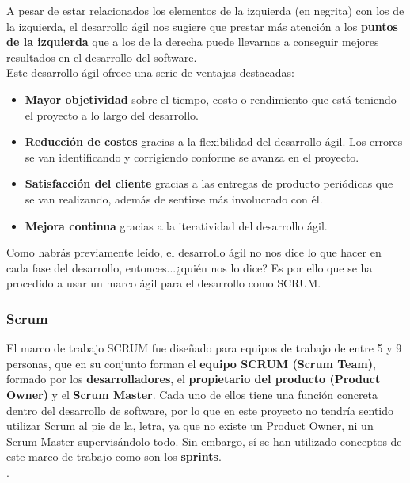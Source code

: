 A pesar de estar relacionados los elementos de la izquierda (en negrita) con los de la
izquierda, el desarrollo ágil nos sugiere que prestar más atención a los \textbf{puntos
de la izquierda} que a los de la derecha puede llevarnos a conseguir mejores resultados
en el desarrollo del software.\\

Este desarrollo ágil ofrece una serie de ventajas \cite{advantages-agile-methodology}
destacadas:

    \begin{itemize}
        \item \textbf{Mayor objetividad} sobre el tiempo, costo o rendimiento que está
        teniendo el proyecto a lo largo del desarrollo.
        \item \textbf{Reducción de costes} gracias a la flexibilidad del desarrollo ágil.
        Los errores se van identificando y corrigiendo conforme se avanza en el proyecto.
        \item \textbf{Satisfacción del cliente} gracias a las entregas de producto
        periódicas que se van realizando, además de sentirse más involucrado con él.
        \item \textbf{Mejora continua} gracias a la iteratividad del desarrollo ágil. 
    \end{itemize}

Como habrás previamente leído, el desarrollo ágil no nos dice lo que hacer en cada fase
del desarrollo, entonces...¿quién nos lo dice? Es por ello que se ha procedido a usar un
marco ágil para el desarrollo como SCRUM.\\

\subsubsection{Scrum}
El marco de trabajo SCRUM \cite{scrum} fue diseñado para equipos de trabajo de entre 5 y 9
personas, que en su conjunto forman el \textbf{equipo SCRUM (Scrum Team)}, formado por los
\textbf{desarrolladores}, el \textbf{propietario del producto (Product Owner)} y el
\textbf{Scrum Master}. Cada uno de ellos tiene una función concreta dentro del desarrollo
de software, por lo que en este proyecto no tendría sentido utilizar Scrum al pie de la,
letra, ya que no existe un Product Owner, ni un Scrum Master supervisándolo todo. Sin
embargo, sí se han utilizado conceptos de este marco de trabajo como son los 
\textbf{sprints}.\\.

